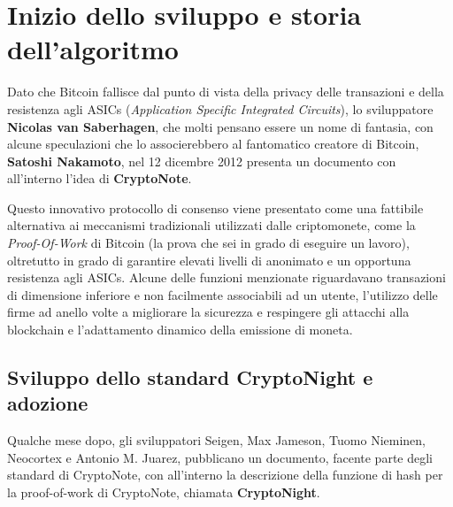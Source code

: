 \documentclass[
]{article}
\author{}
\date{}
\begin{document}
\section{Inizio dello sviluppo e storia
dell'algoritmo}\label{inizio-dello-sviluppo-e-storia-dellalgoritmo}

Dato che Bitcoin fallisce dal punto di vista della privacy delle
transazioni e della resistenza agli ASICs (\emph{Application Specific
Integrated Circuits}), lo sviluppatore \textbf{Nicolas van Saberhagen},
che molti pensano essere un nome di fantasia, con alcune speculazioni
che lo associerebbero al fantomatico creatore di Bitcoin,
\textbf{Satoshi Nakamoto}, nel 12 dicembre 2012 presenta un documento
con all'interno l'idea di \textbf{CryptoNote}.

Questo innovativo protocollo di consenso viene presentato come una
fattibile alternativa ai meccanismi tradizionali utilizzati dalle
criptomonete, come la \emph{Proof-Of-Work} di Bitcoin (la prova che sei
in grado di eseguire un lavoro), oltretutto in grado di garantire
elevati livelli di anonimato e un opportuna resistenza agli ASICs.
Alcune delle funzioni menzionate riguardavano transazioni di dimensione
inferiore e non facilmente associabili ad un utente, l'utilizzo delle
firme ad anello volte a migliorare la sicurezza e respingere gli
attacchi alla blockchain e l'adattamento dinamico della emissione di
moneta.

\subsection{Sviluppo dello standard CryptoNight e
adozione}\label{sviluppo-dello-standard-cryptonight-e-adozione}

Qualche mese dopo, gli sviluppatori Seigen, Max Jameson, Tuomo Nieminen,
Neocortex e Antonio M. Juarez, pubblicano un documento, facente parte
degli standard di CryptoNote, con all'interno la descrizione della
funzione di hash per la proof-of-work di CryptoNote, chiamata
\textbf{CryptoNight}.
\end{document}

